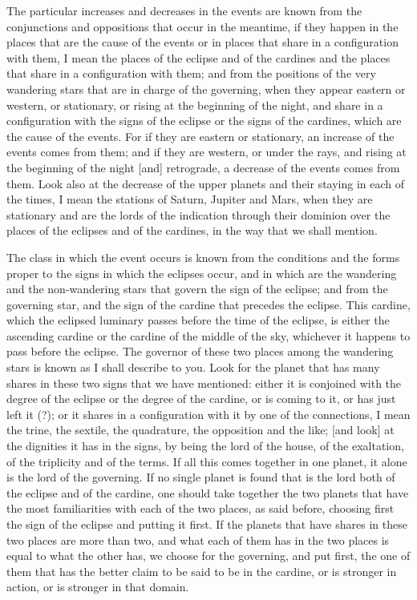 \documentclass[11pt]{article}
\newcommand{\Fol}[1]{\marginpar{\footnotesize\color{gray}f.\,#1}}
\begin{document}
\par The particular increases and decreases in the events are known from the conjunctions and oppositions that occur in the meantime, if they happen in the places that are the cause of the events or in places that share in a configuration with them, I mean the places of the eclipse and of the cardines and the places that share in a configuration with them; and from the positions of the very wandering stars that are in charge of the governing, when they appear eastern or western, or stationary, or rising at the beginning of the night, and share in a configuration with the signs of the eclipse or the signs of the cardines, which are the cause of the events. For if they are eastern or stationary, an increase of the events comes from them; and if they are western, or under the rays, and rising at the beginning of the night [and] retrograde, a decrease of the events comes from them. Look also at the decrease of the upper planets and their staying in each of the times, I mean the stations of Saturn, Jupiter and Mars, when they are stationary and are the lords of the indication through their dominion over the places of the eclipses and of the cardines, in the way that we shall mention.\par
\par \Fol{27v}The class in which the event occurs is known from the conditions and the forms proper to the signs in which the eclipses occur, and in which are the wandering and the non-wandering stars that govern the sign of the eclipse; and from the governing star, and the sign of the cardine that precedes the eclipse. This cardine, which the eclipsed luminary passes before the time of the eclipse, is either the ascending cardine or the cardine of the middle of the sky, whichever it happens to pass before the eclipse. The governor of these two places among the wandering stars is known as I shall describe to you. Look for the planet that has many shares in these two signs that we have mentioned: either it is conjoined with the degree of the eclipse or the degree of the cardine, or is coming to it, or has just left it (?); or it shares in a configuration with it by one of the connections, I mean the trine, the sextile, the quadrature, the opposition and the like; [and look] at the dignities it has in the signs, by being the lord of the house, of the exaltation, of the triplicity and of the terms. If all this comes together in one planet, it alone is the lord of the governing. If no single planet is found that is the lord both of the eclipse and of the cardine, one should take together the two planets that have the most familiarities with each of the two places, as said before, choosing first the sign of the eclipse and putting it first. If the planets that have shares in these two places are more than two, and what each of them has in the two places is equal to what the other has, we choose for the governing, and put first, the one of them that has the better claim to be said to be in the cardine, or is stronger in action, or is stronger in that domain.\par
\end{document}
